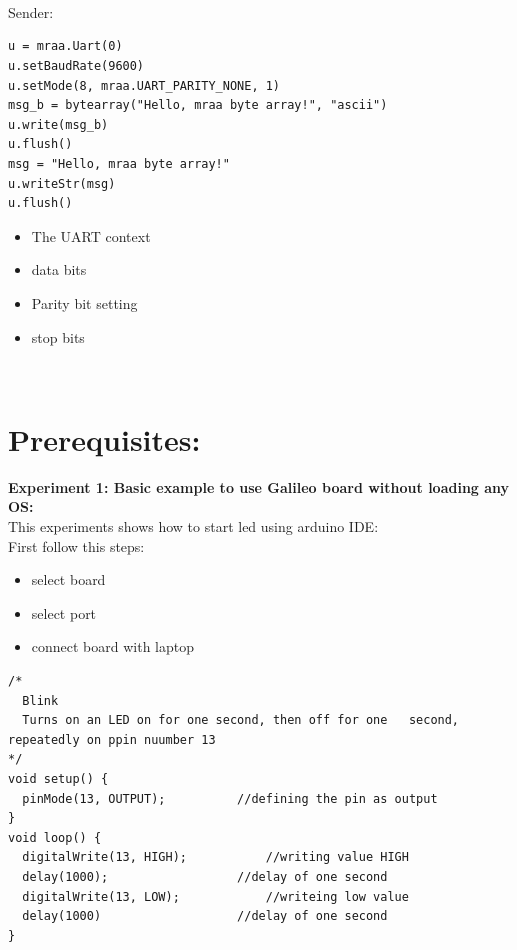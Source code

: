 \documentclass[11pt,a4paper]{article}
\newcommand\tab[1][1cm]{\hspace*{#1}}
\begin{document}
\begin{itemize}
\begin{itemize}
\end{itemize}
\tab{if you do not specifies this method it will take default value which is suitable for most of the cases.}\\
\tab{And method dataAvailabe() we can get knowledge weather more bits available or not. And using readStr() method we can get content in string data type.}\\
\vspace{.2cm}\\
Sender:
\begin{lstlisting}
u = mraa.Uart(0)
u.setBaudRate(9600)
u.setMode(8, mraa.UART_PARITY_NONE, 1)
msg_b = bytearray("Hello, mraa byte array!", "ascii")
u.write(msg_b)
u.flush()
msg = "Hello, mraa byte array!"
u.writeStr(msg)
u.flush()
\end{lstlisting}
\tab{here mraa.Uart(0) gives uart object and 0 is init perameter. And using setBaudRate() method we can set baudrate. And using setMode() method have four perameters in sequnce:}
\begin{itemize}
\item The UART context
\item data bits
\item Parity bit setting
\item stop bits

\end{itemize}
\tab{
here u.write() send data but it accepts input only in byte array. But here writeStr() method is also avilabe to dirct input into string.}\\

\end{itemize}
\newpage
\section{Prerequisites:}
	\vspace{1cm}
    \textbf{\Large{Experiment 1: Basic example to use Galileo board without loading any OS:}}\\
    \vspace{.1cm}
    This experiments shows how to start led using arduino IDE:\\
    First follow this steps:\\
    \begin{itemize}
\item select board
\item select port
\item connect board with laptop
\end{itemize}
\vspace{.1cm}
\begin{lstlisting}
/*
  Blink
  Turns on an LED on for one second, then off for one 	second, repeatedly on ppin nuumber 13
*/
void setup() {
  pinMode(13, OUTPUT);			//defining the pin as output
}
void loop() {
  digitalWrite(13, HIGH);			//writing value HIGH
  delay(1000);					//delay of one second
  digitalWrite(13, LOW);			//writeing low value
  delay(1000)					//delay of one second
}

\end{lstlisting}
\end{document}
